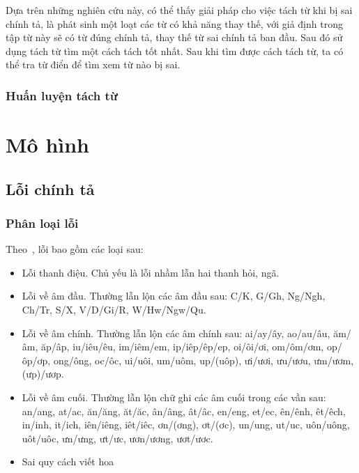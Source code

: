 \documentclass[a4paper,oneside]{book} %
\newcommand{\note}[1]{\underline{#1}}
\theoremstyle{break}
\begin{document}
Dựa trên những nghiên cứu này, có thể thấy giải pháp cho việc tách từ khi bị
sai chính tả, là phát sinh một loạt các từ có khả năng thay thế, với
giả định trong tập từ này sẽ có từ đúng chính tả, thay thế từ sai chính
tả ban đầu. Sau đó sử dụng tách từ tìm một cách tách tốt nhất. Sau khi
tìm được cách tách từ, ta có thể tra từ điển để tìm xem từ nào bị sai.




\subsection{Huấn luyện tách từ}





\chapter{Mô hình}
\label{cha:model}
\minitoc



\section{Lỗi chính tả}


\subsection{Phân loại lỗi}

Theo~\cite{LoiChinhTa}, lỗi bao gồm các loại sau:
\begin{itemize}
\item Lỗi thanh điệu. Chủ yếu là lỗi nhầm lẫn hai thanh hỏi, ngã.
\item Lỗi về âm đầu. Thường lẫn lộn các âm đầu sau: C/K, G/Gh, Ng/Ngh,
  Ch/Tr, S/X, V/D/Gi/R, W/Hw/Ngw/Qu.
\item Lỗi về âm chính. Thường lẫn lộn các âm chính sau: ai/ay/ây,
  ao/au/âu, ăm/âm, ăp/âp, iu/iêu/êu, im/iêm/em, ip/iêp/êp/ep,
  oi/ôi/ơi, om/ôm/ơm, op/ôp/ơp, ong/ông, oc/ôc, ui/uôi, um/uôm, up/(uôp),
  ưi/ươi, ưu/ươu, ưm/ươm, (ưp)/ươp.
\item Lỗi về âm cuối. Thường lẫn lộn chữ ghi các âm cuối trong các vần
  sau:
  an/ang, at/ac, ăn/ăng, ăt/ăc, ân/âng, ât/âc, en/eng, et/ec, ên/ênh,
  êt/êch, in/inh, it/ich, iên/iêng, iêt/iêc, ơn/(ơng), ơt/(ơc),
  un/ung, ut/uc, uôn/uông, uôt/uôc, ưn/ưng, ưt/ưc, ươn/ương, ươt/ươc.
\item Sai quy cách viết hoa
\end{itemize}
\end{document}
